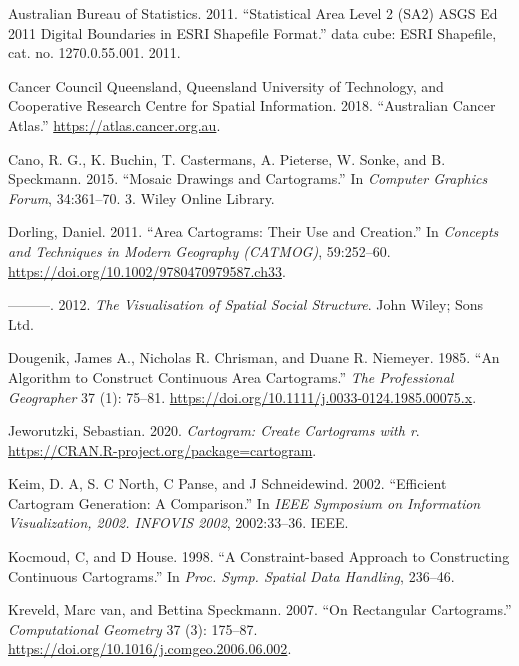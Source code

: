 \hypertarget{refs}{}
\begin{CSLReferences}{1}{0}
\leavevmode{}%
Australian Bureau of Statistics. 2011. {``{Statistical Area Level 2 (SA2) ASGS Ed 2011 Digital Boundaries in ESRI Shapefile Format}.''} data cube: ESRI Shapefile, cat. no. 1270.0.55.001. 2011.

\leavevmode{}%
Cancer Council Queensland, Queensland University of Technology, and Cooperative Research Centre for Spatial Information. 2018. {``{Australian Cancer Atlas}.''} \url{https://atlas.cancer.org.au}.

\leavevmode{}%
Cano, R. G., K. Buchin, T. Castermans, A. Pieterse, W. Sonke, and B. Speckmann. 2015. {``{Mosaic Drawings and Cartograms}.''} In \emph{Computer Graphics Forum}, 34:361--70. 3. Wiley Online Library.

\leavevmode{}%
Dorling, Daniel. 2011. {``Area Cartograms: Their Use and Creation.''} In \emph{Concepts and Techniques in Modern Geography (CATMOG)}, 59:252--60. \url{https://doi.org/10.1002/9780470979587.ch33}.

\leavevmode{}%
---------. 2012. \emph{{The Visualisation of Spatial Social Structure}}. John Wiley; Sons Ltd.

\leavevmode{}%
Dougenik, James A., Nicholas R. Chrisman, and Duane R. Niemeyer. 1985. {``{An Algorithm to Construct Continuous Area Cartograms}.''} \emph{The Professional Geographer} 37 (1): 75--81. \url{https://doi.org/10.1111/j.0033-0124.1985.00075.x}.

\leavevmode{}%
Jeworutzki, Sebastian. 2020. \emph{Cartogram: Create Cartograms with r}. \url{https://CRAN.R-project.org/package=cartogram}.

\leavevmode{}%
Keim, D. A, S. C North, C Panse, and J Schneidewind. 2002. {``{Efficient Cartogram Generation: A Comparison}.''} In \emph{{IEEE Symposium on Information Visualization, 2002. INFOVIS 2002}}, 2002:33--36. IEEE.

\leavevmode{}%
Kocmoud, C, and D House. 1998. {``{A Constraint-based Approach to Constructing Continuous Cartograms}.''} In \emph{Proc. Symp. Spatial Data Handling}, 236--46.

\leavevmode{}%
Kreveld, Marc van, and Bettina Speckmann. 2007. {``On {R}ectangular {C}artograms.''} \emph{{Computational Geometry}} 37 (3): 175--87. \url{https://doi.org/10.1016/j.comgeo.2006.06.002}.


\end{CSLReferences}
